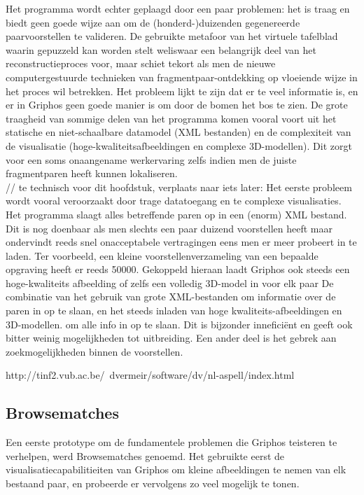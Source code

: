 Het programma wordt echter geplaagd door een paar problemen: het is traag en biedt geen goede wijze aan om de (honderd-)duizenden gegenereerde paarvoorstellen te valideren. De gebruikte metafoor van het virtuele tafelblad waarin gepuzzeld kan worden stelt weliswaar een belangrijk deel van het reconstructieproces voor, maar schiet tekort als men de nieuwe computergestuurde technieken van fragmentpaar-ontdekking op vloeiende wijze in het proces wil betrekken. Het probleem lijkt te zijn dat er te veel informatie is, en er in Griphos geen goede manier is om door de bomen het bos te zien. De grote traagheid van sommige delen van het programma komen vooral voort uit het statische en niet-schaalbare datamodel (XML bestanden) en de complexiteit van de visualisatie (hoge-kwaliteitsafbeeldingen en complexe 3D-modellen). Dit zorgt voor een soms onaangename werkervaring zelfs indien men de juiste fragmentparen heeft kunnen lokaliseren.\\

// te technisch voor dit hoofdstuk, verplaats naar iets later:
Het eerste probleem wordt vooral veroorzaakt door trage datatoegang en te complexe visualisaties. Het programma slaagt alles betreffende paren op in een (enorm) XML bestand. Dit is nog doenbaar als men slechts een paar duizend voorstellen heeft maar ondervindt reeds snel onacceptabele vertragingen eens men er meer probeert in te laden. Ter voorbeeld, een kleine voorstellenverzameling van een bepaalde opgraving heeft er reeds 50000. Gekoppeld hieraan laadt Griphos ook steeds een hoge-kwaliteits afbeelding of zelfs een volledig 3D-model in voor elk paar De combinatie van het gebruik van grote XML-bestanden om informatie over de paren in op te slaan, en het steeds inladen van hoge kwaliteits-afbeeldingen en 3D-modellen. om alle info in op te slaan. Dit is bijzonder innefici\"ent en geeft ook bitter weinig mogelijkheden tot uitbreiding. Een ander deel is het gebrek aan zoekmogelijkheden binnen de voorstellen.

http://tinf2.vub.ac.be/~dvermeir/software/dv/nl-aspell/index.html

\subsection{Browsematches}

Een eerste prototype om de fundamentele problemen die Griphos teisteren te verhelpen, werd Browsematches genoemd. Het gebruikte eerst de visualisatiecapabilitieiten van Griphos om kleine afbeeldingen te nemen van elk bestaand paar, en probeerde er vervolgens zo veel mogelijk te tonen. \\

